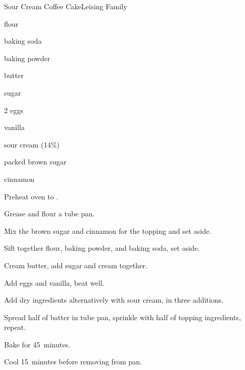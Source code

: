 \begin{recipe}{Sour Cream Coffee Cake}{Leising Family}{}

\begin{ingredients}
\item {} flour
\item {} baking soda
\item {} baking powder
\item \C{\half} butter
\item {} sugar
\item 2 eggs
\item {} vanilla
\item \C{1\threequarter} sour cream (14\%)
\item \C{\quarter} packed brown sugar
\item \tp{1\half} cinnamon
\end{ingredients}

\begin{directions}
\item Preheat oven to .
\item Grease and flour a  tube pan.
\item Mix the brown sugar and cinnamon for the topping and set aside.
\item Sift together flour, baking powder, and baking soda, set aside.
\item Cream butter, add sugar and cream together.
\item Add eggs and vanilla, beat well.
\item Add dry ingredients alternatively with sour cream, in three additions.
\item Spread half of batter in tube pan, sprinkle with half of topping ingredients, repeat.
\item Bake for 45~minutes.
\item Cool 15~minutes before removing from pan.
\end{directions}

\end{recipe}
